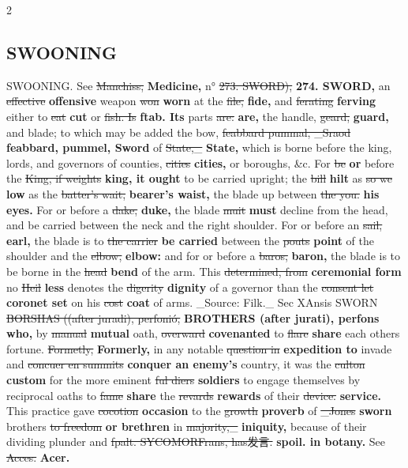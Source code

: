 \documentclass[10pt]{article}
\begin{document}
\begin{multicols}{2}
\subsection*{SWOONING}
SWOONING. See \sout{Manchiss,} \textbf{Medicine,} n° \sout{273. SWORD),} \textbf{274. SWORD,} an \sout{effective} \textbf{offensive} weapon \sout{won} \textbf{worn} at the \sout{file,} \textbf{fide,} and \sout{ferating} \textbf{ferving} either to \sout{eat} \textbf{cut} or \sout{fish. Is} \textbf{ftab. Its} parts \sout{are:} \textbf{are,} the handle, \sout{geard,} \textbf{guard,} and blade; to which may be added the bow, \sout{feabbard pummal, \_Sraod} \textbf{feabbard, pummel, Sword} of \sout{State,\_} \textbf{State,} which is borne before the king, lords, and governors of counties, \sout{cities} \textbf{cities,} or boroughs, \&c. For \sout{be} \textbf{or} before the \sout{King, if weights} \textbf{king, it ought} to be carried upright; the \sout{bill} \textbf{hilt} as \sout{so we} \textbf{low} as the \sout{batter's wait,} \textbf{bearer's waist,} the blade up between \sout{the you.} \textbf{his eyes.} For or before a \sout{dake,} \textbf{duke,} the blade \sout{muit} \textbf{must} decline from the head, and be carried between the neck and the right shoulder. For or before an \sout{sail,} \textbf{earl,} the blade is to \sout{the carrier} \textbf{be carried} between the \sout{pouts} \textbf{point} of the shoulder and the \sout{elbow,} \textbf{elbow:} and for or before a \sout{baros,} \textbf{baron,} the blade is to be borne in the \sout{head} \textbf{bend} of the arm. This \sout{determined, from} \textbf{ceremonial form} no \sout{Heil} \textbf{less} denotes the \sout{digerity} \textbf{dignity} of a governor than the \sout{consent let} \textbf{coronet set} on his \sout{cost} \textbf{coat} of arms. \_Source: Filk.\_ Sec XAnsis SWORN \sout{BORSHAS ((after juradi), perfonió,} \textbf{BROTHERS (after jurati), perfons who,} by \sout{manual} \textbf{mutual} oath, \sout{overward} \textbf{covenanted} to \sout{flare} \textbf{share} each others fortune. \sout{Formetly,} \textbf{Formerly,} in any notable \sout{question in} \textbf{expedition to} invade and \sout{concuer en summits} \textbf{conquer an enemy's} country, it was the \sout{culton} \textbf{custom} for the more eminent \sout{ful diers} \textbf{soldiers} to engage themselves by reciprocal oaths to \sout{fame} \textbf{share} the \sout{revards} \textbf{rewards} of their \sout{device.} \textbf{service.} This practice gave \sout{cocotion} \textbf{occasion} to the \sout{growth} \textbf{proverb} of \sout{\_Jones} \textbf{sworn} brothers \sout{to freedom} \textbf{or brethren} in \sout{majority,\_} \textbf{iniquity,} because of their dividing plunder and \sout{fpalt. SYCOMORFrans, has发言.} \textbf{spoil. in botany.} See \sout{Acces.} \textbf{Acer.}


\end{multicols}
\end{document}
